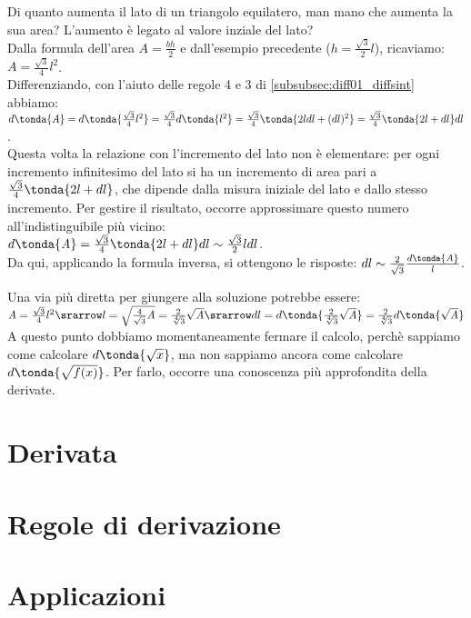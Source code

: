 \begin{esempio}
Di quanto aumenta il lato di un triangolo equilatero,
man mano che aumenta la sua area? L'aumento è legato al valore inziale del lato?\\
Dalla formula dell'area $\mathit{A}=\frac{bh}{2}$ e dall'esempio precedente
($h=\frac{\sqrt{3}}{2}l$), ricaviamo: $\mathit{A}=\frac{\sqrt{3}}{4}l^2$.\\
Differenziando, con l'aiuto delle regole 4 e 3 di 
\ref{subsubsec:diff01_diffsint} abbiamo:\\
$d\tonda{\mathit{A}}=d\tonda{\frac{\sqrt{3}}{4}l^2}=\frac{\sqrt{3}}{4}d\tonda{l^2}=
\frac{\sqrt{3}}{4}\tonda{2ldl+(dl)^2}=\frac{\sqrt{3}}{4}\tonda{2l+dl}dl$.\\
Questa volta la relazione con l'incremento del lato non è elementare: per ogni 
incremento infinitesimo del lato si ha un incremento di area pari a 
$\frac{\sqrt{3}}{4}\tonda{2l+dl}$, che dipende dalla misura iniziale del lato
e dallo stesso incremento. Per gestire il risultato, occorre approssimare
questo numero all'indistinguibile più vicino:\\
$d\tonda{\mathit{A}}=\frac{\sqrt{3}}{4}\tonda{2l+dl}dl\sim
\frac{\sqrt{3}}{2}ldl$.\\
Da qui, applicando la formula inversa, si ottengono le 
risposte:
$dl\sim\frac{2}{\sqrt{3}}\frac{d\tonda{\mathit{A}}}{l}$.
\begin{osservazione}
 Una via più diretta per giungere alla soluzione potrebbe essere: \\
 $\mathit{A}=\frac{\sqrt{3}}{4}l^2\srarrow l=\sqrt{\frac{4}{\sqrt{3}}\mathit{A}}=
 \frac{2}{\sqrt[4]{3}}\sqrt{\mathit{A}}\srarrow dl=
 d\tonda{\frac{2}{\sqrt[4]{3}}\sqrt{\mathit{A}}}=
 \frac{2}{\sqrt[4]{3}}d\tonda{\sqrt{\mathit{A}}}$\\
 A questo punto dobbiamo momentaneamente fermare il calcolo, perchè 
 sappiamo come calcolare $d\tonda{\sqrt{x}}$, ma 
 non sappiamo ancora come calcolare $d\tonda{\sqrt{f(x)}}$. Per farlo, 
 occorre una conoscenza più approfondita della derivate.
\end{osservazione}

\end{esempio}
\section{Derivata}
\label{sec::diff01_derivata}


\section{Regole di derivazione}
\label{sec:02_logaritmiche}

\section{Applicazioni}
\label{sec:diff01_applicazioni}
